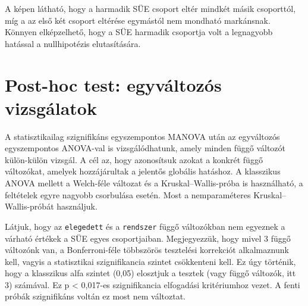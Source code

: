 \documentclass[
  letterpaper,
]{krantz}
\makeatletter
\newenvironment{Shaded}{\begin{snugshade}}{\end{snugshade}}
\newcommand{\AttributeTok}[1]{\textcolor[rgb]{0.40,0.45,0.13}{#1}}
\newcommand{\CommentTok}[1]{\textcolor[rgb]{0.37,0.37,0.37}{#1}}
\newcommand{\FunctionTok}[1]{\textcolor[rgb]{0.28,0.35,0.67}{#1}}
\newcommand{\NormalTok}[1]{\textcolor[rgb]{0.00,0.23,0.31}{#1}}
\newcommand{\SpecialCharTok}[1]{\textcolor[rgb]{0.37,0.37,0.37}{#1}}
\newenvironment{kframe}{%
\medskip{}
\setlength{\fboxsep}{.8em}
 \def\at@end@of@kframe{}%
 \ifinner\ifhmode%
  \def\at@end@of@kframe{\end{minipage}}%
  \begin{minipage}{\columnwidth}%
 \fi\fi%
 \def\FrameCommand##1{\hskip\@totalleftmargin \hskip-\fboxsep
 \colorbox{shadecolor}{##1}\hskip-\fboxsep
     \hskip-\linewidth \hskip-\@totalleftmargin \hskip\columnwidth}%
 \MakeFramed {\advance\hsize-\width
   \@totalleftmargin\z@ \linewidth\hsize
   \@setminipage}}%
 {\par\unskip\endMakeFramed%
 \at@end@of@kframe}
\renewenvironment{Shaded}{\begin{kframe}}{\end{kframe}}
\makeatother
\begin{document}
A képen látható, hogy a harmadik SÜE csoport eltér mindkét másik
csoporttól, míg a az első két csoport eltérése egymástól nem mondható
markánsnak. Könnyen elképzelhető, hogy a SÜE harmadik csoportja volt a
legnagyobb hatással a nullhipotézis elutasítására.

\hypertarget{post-hoc-test-egyvuxe1ltozuxf3s-vizsguxe1latok}{%
\section{Post-hoc test: egyváltozós
vizsgálatok}\label{post-hoc-test-egyvuxe1ltozuxf3s-vizsguxe1latok}}

A statisztikailag szignifikáns egyszempontos MANOVA után az egyváltozós
egyszempontos ANOVA-val is vizsgálódhatunk, amely minden függő változót
külön-külön vizsgál. A cél az, hogy azonosítsuk azokat a konkrét függő
változókat, amelyek hozzájárultak a jelentős globális hatáshoz. A
klasszikus ANOVA mellett a Welch-féle változat és a
Kruskal--Wallis-próba is használható, a feltételek egyre nagyobb
csorbulása esetén. Most a nemparaméteres Kruskal--Wallis-próbát
használjuk.

\begin{Shaded}
\end{Shaded}

Látjuk, hogy az \texttt{elegedett} és a \texttt{rendszer} függő
változókban nem egyeznek a várható értékek a SÜE egyes csoportjaiban.
Megjegyezzük, hogy mivel 3 függő változónk van, a Bonferroni-féle
többszörös tesztelési korrekciót alkalmaznunk kell, vagyis a
statisztikai szignifikancia szintet csökkenteni kell. Ez úgy történik,
hogy a klasszikus alfa szintet (0,05) elosztjuk a tesztek (vagy függő
változók, itt 3) számával. Ez p \textless{} 0,017-es szignifikancia
elfogadási kritériumhoz vezet. A fenti próbák szignifikáns voltán ez
most nem változtat.
\end{document}
